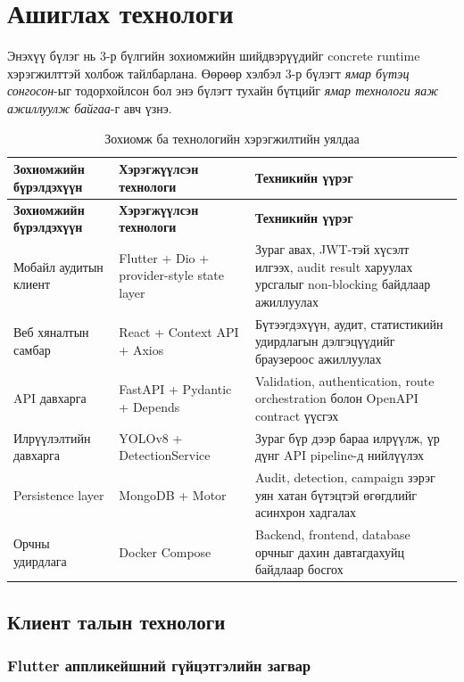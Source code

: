 \chapter{Ашиглах технологи}

Энэхүү бүлэг нь 3-р бүлгийн зохиомжийн шийдвэрүүдийг concrete runtime хэрэгжилттэй холбож тайлбарлана. Өөрөөр хэлбэл 3-р бүлэгт \textit{ямар бүтэц сонгосон}-ыг тодорхойлсон бол энэ бүлэгт тухайн бүтцийг \textit{ямар технологи яаж ажиллуулж байгаа}-г авч үзнэ.

\begin{longtable}{|p{3.1cm}|p{3.6cm}|p{5.7cm}|}
\caption{Зохиомж ба технологийн хэрэгжилтийн уялдаа}
\label{tab:design_to_technology_mapping} \\
\hline
\textbf{Зохиомжийн бүрэлдэхүүн} & \textbf{Хэрэгжүүлсэн технологи} & \textbf{Техникийн үүрэг} \\
\hline
\endfirsthead
\hline
\textbf{Зохиомжийн бүрэлдэхүүн} & \textbf{Хэрэгжүүлсэн технологи} & \textbf{Техникийн үүрэг} \\
\hline
\endhead
\hline
\endfoot
Мобайл аудитын клиент & Flutter + Dio + provider-style state layer & Зураг авах, JWT-тэй хүсэлт илгээх, audit result харуулах урсгалыг non-blocking байдлаар ажиллуулах \\
\hline
Веб хяналтын самбар & React + Context API + Axios & Бүтээгдэхүүн, аудит, статистикийн удирдлагын дэлгэцүүдийг браузероос ажиллуулах \\
\hline
API давхарга & FastAPI + Pydantic + Depends & Validation, authentication, route orchestration болон OpenAPI contract үүсгэх \\
\hline
Илрүүлэлтийн давхарга & YOLOv8 + DetectionService & Зураг бүр дээр бараа илрүүлж, үр дүнг API pipeline-д нийлүүлэх \\
\hline
Persistence layer & MongoDB + Motor & Audit, detection, campaign зэрэг уян хатан бүтэцтэй өгөгдлийг асинхрон хадгалах \\
\hline
Орчны удирдлага & Docker Compose & Backend, frontend, database орчныг дахин давтагдахуйц байдлаар босгох \\
\hline
\end{longtable}

\section{Клиент талын технологи}

\subsection{Flutter аппликейшний гүйцэтгэлийн загвар}

